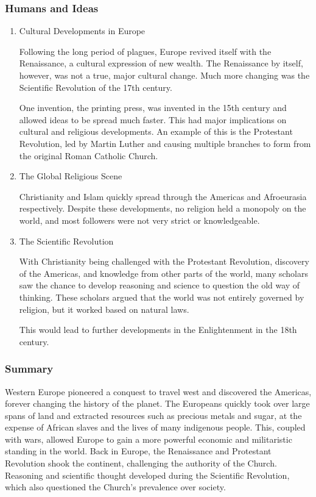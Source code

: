 \documentclass[11pt]{article}
\begin{document}
\subsubsection{Humans and Ideas}
\label{sec:org7f78c80}
\begin{enumerate}
\item Cultural Developments in Europe
\label{sec:orgec91056}

Following the long period of plagues, Europe revived itself with the Renaissance, a cultural expression of new wealth. The Renaissance by itself, however, was not a true, major cultural change. Much more changing was the Scientific Revolution of the 17th century.

One invention, the printing press, was invented in the 15th century and allowed ideas to be spread much faster. This had major implications on cultural and religious developments. An example of this is the Protestant Revolution, led by Martin Luther and causing multiple branches to form from the original Roman Catholic Church.

\item The Global Religious Scene
\label{sec:orga8876c7}

Christianity and Islam quickly spread through the Americas and Afroeurasia respectively. Despite these developments, no religion held a monopoly on the world, and most followers were not very strict or knowledgeable.

\item The Scientific Revolution
\label{sec:org547ed00}

With Christianity being challenged with the Protestant Revolution, discovery of the Americas, and knowledge from other parts of the world, many scholars saw the chance to develop reasoning and science to question the old way of thinking. These scholars argued that the world was not entirely governed by religion, but it worked based on natural laws.

This would lead to further developments in the Enlightenment in the 18th century.
\end{enumerate}

\subsubsection{Summary}
\label{sec:org338457e}

Western Europe pioneered a conquest to travel west and discovered the Americas, forever changing the history of the planet. The Europeans quickly took over large spans of land and extracted resources such as precious metals and sugar, at the expense of African slaves and the lives of many indigenous people. This, coupled with wars, allowed Europe to gain a more powerful economic and militaristic standing in the world. Back in Europe, the Renaissance and Protestant Revolution shook the continent, challenging the authority of the Church. Reasoning and scientific thought developed during the Scientific Revolution, which also questioned the Church's prevalence over society.
\end{document}
